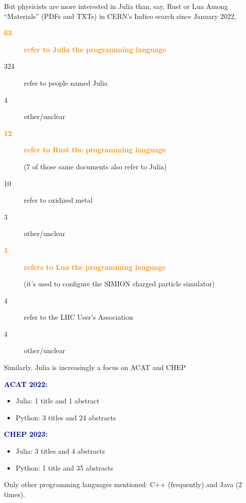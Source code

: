 \documentclass[aspectratio=169]{beamer}
\begin{document}
\begin{frame}{But physicists are more interested in Julia than, say, Rust or Lua}
\vspace{0.5 cm}
Among ``Materials'' (PDFs and TXTs) in CERN's Indico search since January 2022,

\vspace{0.25 cm}
\begin{description}
\item[\textcolor{darkorange}{\bf 63}] \textcolor{darkorange}{\bf refer to Julia the programming language}
\item[324] refer to people named Julia
\item[4] other/unclear
\end{description}

\begin{description}
\item[\textcolor{darkorange}{\bf 12}] \textcolor{darkorange}{\bf refer to Rust the programming language}

(7 of those same documents also refer to Julia)
\item[10] refer to oxidized metal
\item[3] other/unclear
\end{description}

\begin{description}
\item[\textcolor{darkorange}{\bf 1}] \textcolor{darkorange}{\bf refers to Lua the programming language}

(it's used to configure the SIMION charged particle simulator)
\item[4] refer to the LHC User's Association
\item[4] other/unclear
\end{description}
\end{frame}

\begin{frame}{Similarly, Julia is increasingly a focus on ACAT and CHEP}
\vspace{0.5 cm}

\textcolor{darkblue}{\Large\bf ACAT 2022:}
\begin{itemize}
\item Julia: 1 title and 1 abstract
\item Python: 3 titles and 24 abstracts
\end{itemize}

\vspace{0.5 cm}
\textcolor{darkblue}{\Large\bf CHEP 2023:}
\begin{itemize}
\item Julia: 3 titles and 4 abstracts
\item Python: 1 title and 35 abstracts
\end{itemize}

\vspace{0.5 cm}
Only other programming languages mentioned: C++ (frequently) and Java (2 times).
\end{frame}
\end{document}
